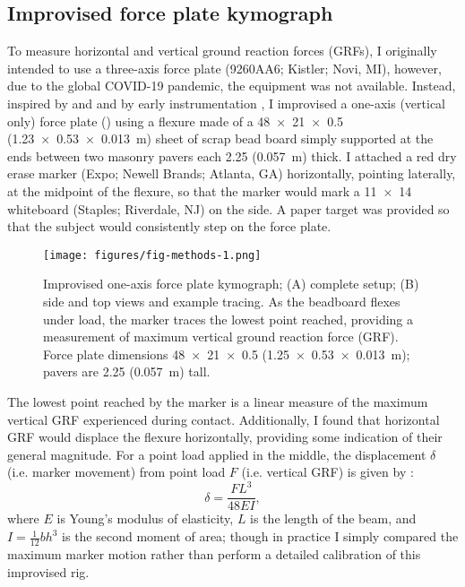 \subsection{Improvised force plate kymograph}
To measure horizontal and vertical ground reaction forces (GRFs), I originally intended to use a three-axis force plate (9260AA6; Kistler; Novi, MI), however, due to the global COVID-19 pandemic, the equipment was not available. Instead, inspired by \citet{denny1983simple} and \citet{bell1984quantifying} and by early instrumentation \citep{baker2007history, mayer2010physiological, marey1873locomotion, carlet1872essai}, I improvised a one-axis (vertical only) force plate () using a flexure made of a \SI{48 x 21 x 0.5}{\inch} (\SI{1.23 x 0.53 x 0.013}{\meter}) sheet of scrap bead board simply supported at the ends between two masonry pavers each \SI{2.25}{\inch} (\SI{0.057}{\meter}) thick. I attached a red dry erase marker (Expo; Newell Brands; Atlanta, GA) horizontally, pointing laterally, at the midpoint of the flexure, so that the marker would mark a \SI{11x14}{\inch} whiteboard (Staples; Riverdale, NJ) on the side. A paper target was provided so that the subject would consistently step on the force plate. 
\begin{figure}
\begin{center}
\texttt{[image: figures/fig-methods-1.png]}
\end{center}
\caption{Improvised one-axis force plate kymograph; (A) complete setup; (B) side and top views and example tracing. As the beadboard flexes under load, the marker traces the lowest point reached, providing a measurement of maximum vertical ground reaction force (GRF). Force plate dimensions \SI{48 x 21 x 0.5}{\inch} (\SI{1.25 x 0.53 x0.013}{\meter}); pavers are \SI{2.25}{\inch} (\SI{0.057}{\meter}) tall.}
\label{fig:methods:forceplate}
\end{figure}
The lowest point reached by the marker is a linear measure of the maximum vertical GRF experienced during contact. Additionally, I found that horizontal GRF would displace the flexure horizontally, providing some indication of their general magnitude. For a point load applied in the middle, the displacement $\delta$ (i.e. marker movement) from point load $F$ (i.e. vertical GRF) is given by \cite{craig2011mechanics}: 
\begin{equation}
\delta = \frac{FL^3}{48 EI},
\label{eq:sensor-response}
\end{equation}
where $E$ is Young's modulus of elasticity, $L$ is the length of the beam, and $I=\frac{1}{12}bh^3$ is the second moment of area; though in practice I simply compared the maximum marker motion rather than perform a detailed calibration of this improvised rig. 

